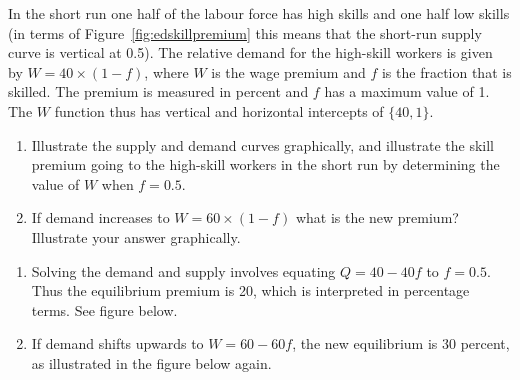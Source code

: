 \begin{enumialphparenastyle}
\begin{econex}\label{ex:ch13ex5}
In the short run one half of the labour force has high skills and one half low skills (in terms of Figure~\ref{fig:edskillpremium} this means that the short-run supply curve is vertical at 0.5). The relative demand for the high-skill workers is given by $W=40\times (1-f)$, where $W$ is the wage premium and $f$ is the fraction that is skilled. The premium is measured in percent and $f$ has a maximum value of 1. The $W$ function thus has vertical and horizontal intercepts of $\{40,1\}$.
\begin{enumerate}
\item	Illustrate the supply and demand curves graphically, and illustrate the skill premium going to the high-skill workers in the short run by determining the value of $W$ when $f=0.5$. 
\item	If demand increases to $W=60\times (1-f)$ what is the new premium? Illustrate your answer graphically.
\end{enumerate}
\begin{econsolution}
\begin{enumerate}
\item	Solving the demand and supply involves equating $Q=40-40f$ to $f=0.5$. Thus the equilibrium premium is 20, which is interpreted in percentage terms. See figure below.
\item	If demand shifts upwards to $W=60-60f$, the new equilibrium is 30 percent, as illustrated in the figure below again.
\end{enumerate}
\end{econsolution}
\end{econex}


\end{enumialphparenastyle}
